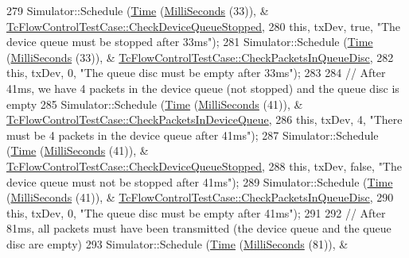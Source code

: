 \begin{DoxyCode}
279       Simulator::Schedule (\hyperlink{classns3_1_1Time}{Time} (\hyperlink{group__timecivil_gaf26127cf4571146b83a92ee18679c7a9}{MilliSeconds} (33)), &
      \hyperlink{classTcFlowControlTestCase_a4ccc9564c9142984fa8041f67b4a518a}{TcFlowControlTestCase::CheckDeviceQueueStopped},
280                           \textcolor{keyword}{this}, txDev, \textcolor{keyword}{true}, \textcolor{stringliteral}{"The device queue must be stopped after 33ms"});
281       Simulator::Schedule (\hyperlink{classns3_1_1Time}{Time} (\hyperlink{group__timecivil_gaf26127cf4571146b83a92ee18679c7a9}{MilliSeconds} (33)), &
      \hyperlink{classTcFlowControlTestCase_ac6d0b6a74dd29a21369bf1d26795098d}{TcFlowControlTestCase::CheckPacketsInQueueDisc},
282                           \textcolor{keyword}{this}, txDev, 0, \textcolor{stringliteral}{"The queue disc must be empty after 33ms"});
283 
284       \textcolor{comment}{// After 41ms, we have 4 packets in the device queue (not stopped) and the queue disc is empty}
285       Simulator::Schedule (\hyperlink{classns3_1_1Time}{Time} (\hyperlink{group__timecivil_gaf26127cf4571146b83a92ee18679c7a9}{MilliSeconds} (41)), &
      \hyperlink{classTcFlowControlTestCase_a7ad467b39fdb155daea4b048619f6d12}{TcFlowControlTestCase::CheckPacketsInDeviceQueue},
286                           \textcolor{keyword}{this}, txDev, 4, \textcolor{stringliteral}{"There must be 4 packets in the device queue after 41ms"});
287       Simulator::Schedule (\hyperlink{classns3_1_1Time}{Time} (\hyperlink{group__timecivil_gaf26127cf4571146b83a92ee18679c7a9}{MilliSeconds} (41)), &
      \hyperlink{classTcFlowControlTestCase_a4ccc9564c9142984fa8041f67b4a518a}{TcFlowControlTestCase::CheckDeviceQueueStopped},
288                           \textcolor{keyword}{this}, txDev, \textcolor{keyword}{false}, \textcolor{stringliteral}{"The device queue must not be stopped after 41ms"});
289       Simulator::Schedule (\hyperlink{classns3_1_1Time}{Time} (\hyperlink{group__timecivil_gaf26127cf4571146b83a92ee18679c7a9}{MilliSeconds} (41)), &
      \hyperlink{classTcFlowControlTestCase_ac6d0b6a74dd29a21369bf1d26795098d}{TcFlowControlTestCase::CheckPacketsInQueueDisc},
290                           \textcolor{keyword}{this}, txDev, 0, \textcolor{stringliteral}{"The queue disc must be empty after 41ms"});
291 
292       \textcolor{comment}{// After 81ms, all packets must have been transmitted (the device queue and the queue disc are empty)}
293       Simulator::Schedule (\hyperlink{classns3_1_1Time}{Time} (\hyperlink{group__timecivil_gaf26127cf4571146b83a92ee18679c7a9}{MilliSeconds} (81)), &

\end{DoxyCode}

